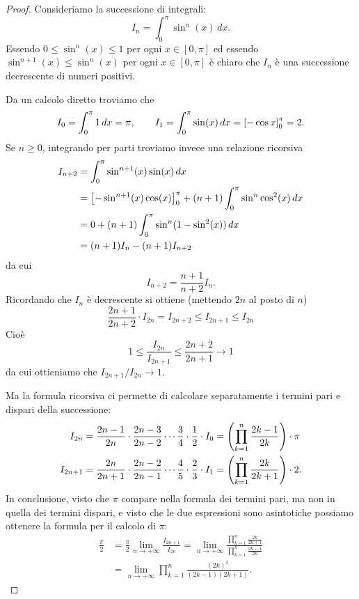 \begin{proof}
Consideriamo la successione di integrali:
\[
  I_n = \int_0^\pi \sin^n(x)\, dx.
\]
Essendo $0\le \sin^n(x) \le 1$ per ogni $x\in [0,\pi]$ ed essendo
$\sin^{n+1}(x)\le \sin^n(x)$ per ogni $x\in[0,\pi]$ è chiaro che $I_n$ è una
successione decrescente di numeri positivi.

Da un calcolo diretto troviamo che
\[
  I_0 = \int_0^\pi 1\, dx = \pi, \qquad
  I_1 = \int_0^\pi \sin(x)\, dx = {\left[ -\cos x \right]}_0^\pi = 2.
\]
Se $n\ge 0$,
integrando per parti troviamo invece una relazione ricorsiva
\begin{align*}
 I_{n+2} &= \int_0^\pi \sin^{n+1}(x) \sin(x)\, dx \\
     &= {\left[ -\sin^{n+1}(x)\cos(x) \right]}_0^\pi + (n+1)\int_0^\pi \sin^{n} \cos^2(x)\, dx \\
     &= 0 + (n+1)\int_0^\pi\sin^{n}(1-\sin^2(x))\, dx \\
     &= (n+1) I_{n} - (n+1) I_{n+2}
\end{align*}
da cui
\[
  I_{n+2} = \frac{n+1}{n+2} I_{n}.
\]
Ricordando che $I_n$ è decrescente si ottiene (mettendo $2n$ al posto di $n$)
\[
  \frac{2n+1}{2n+2} \cdot I_{2n}
  = I_{2n+2}
  \le I_{2n+1}
  \le I_{2n}
\]
Cioè
\[
  1
  \le \frac{I_{2n}}{I_{2n+1}}
  \le \frac{2n+2}{2n+1} \to 1
\]
da cui ottieniamo che $I_{2n+1} / I_{2n} \to 1$.

Ma la formula ricorsiva ci permette di calcolare separatamente
i termini pari e dispari della successione:
\begin{align*}
  I_{2n} &= \frac{2n-1}{2n}\cdot \frac{2n-3}{2n-2} \cdots \frac {3}{4}\cdot \frac{1}{2} \cdot I_0
  = {\left( \prod_{k=1}^n \frac{2k-1}{2k} \right)} \cdot \pi \\
  I_{2n+1} &= \frac{2n}{2n+1}\cdot \frac {2n-2}{2n-1} \cdots
  \frac{4}{5}\cdot \frac{2}{3} \cdot I_1
  = {\left( \prod_{k=1}^n \frac{2k}{2k+1} \right)}\cdot 2.
\end{align*}
In conclusione, visto che $\pi$ compare nella formula dei termini pari, ma
non in quella dei termini dispari, e visto che le due espressioni sono
asintotiche possiamo ottenere
la formula per il calcolo di $\pi$:
\begin{align*}
\frac{\pi}{2}
&= \frac{\pi}{2} \lim_{n\to +\infty} \frac{I_{2n+1}}{I_{2n}}
= \lim_{n\to +\infty} \frac{\displaystyle\prod_{k=1}^n \frac{2k}{2k+1}}{\displaystyle\prod_{k=1}^n \frac{2k-1}{2k}}\\
&= \lim_{n\to +\infty} \prod_{k=1}^{n} \frac{(2k)^2}{(2k-1)(2k+1)}.
\end{align*}


\end{proof}

